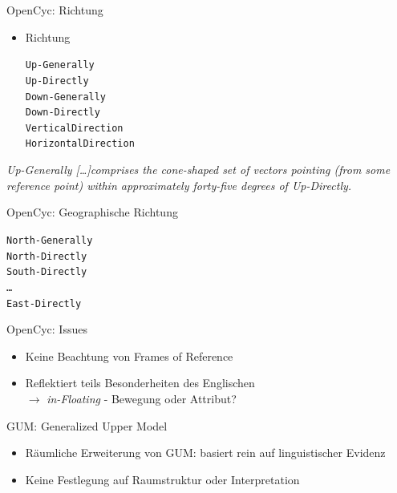 \documentclass[12pt,a4paper]{beamer}
\begin{document}
\begin{frame}{OpenCyc: Richtung}
\begin{itemize}
\item Richtung
\begin{alltt}
    Up-Generally\\
    Up-Directly\\
    Down-Generally\\
    Down-Directly\\
    VerticalDirection\\
    HorizontalDirection
\end{alltt}
\end{itemize}
\textit{Up-Generally [\ldots ]comprises the cone-shaped set of vectors pointing
(from some reference point) within approximately forty-five degrees of
Up-Directly.}
\end{frame}




\begin{frame}{OpenCyc: Geographische Richtung}
\begin{alltt}
    North-Generally\\
    North-Directly\\
    South-Directly\\
    \ldots\\
    East-Directly
\end{alltt}
\end{frame}


\begin{frame}{OpenCyc: Issues}
\begin{itemize}
\item Keine Beachtung von Frames of Reference
\item Reflektiert teils Besonderheiten des Englischen\\
$\to$ \textit{in-Floating} - Bewegung oder Attribut?
\end{itemize}
\end{frame}



\begin{frame}{GUM: Generalized Upper Model}
\begin{itemize}
\item Räumliche Erweiterung von GUM: basiert rein auf linguistischer Evidenz
\item Keine Festlegung auf Raumstruktur oder Interpretation
\end{itemize}
\end{frame}
\end{document}
